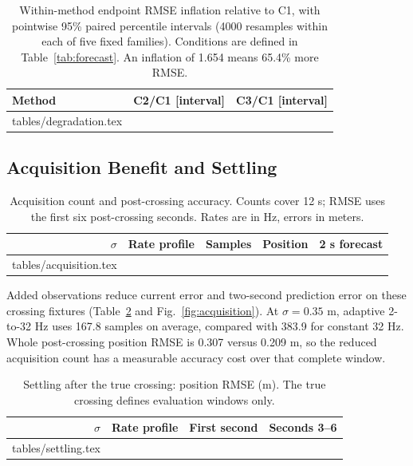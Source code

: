\documentclass[journal]{IEEEtran}
\makeatletter
\newcommand{\inputrows}[1]{\@@input #1 }
\makeatother
\begin{document}
\begin{table}[t]
\centering
\caption{Within-method endpoint RMSE inflation relative to C1, with
pointwise 95\% paired percentile intervals (4000 resamples within each
of five fixed families). Conditions are defined in Table~\ref{tab:forecast}.
An inflation of 1.654 means 65.4\% more RMSE.}
\label{tab:degradation}
\small\setlength{\tabcolsep}{3pt}
\begin{tabular}{lrr}
\toprule Method & C2/C1 [interval] & C3/C1 [interval]\\\midrule
\inputrows{tables/degradation.tex}
\bottomrule
\end{tabular}
\end{table}

\subsection{Acquisition Benefit and Settling}

\begin{table}[t]
\centering
\caption{Acquisition count and post-crossing accuracy.
Counts cover 12 s; RMSE uses the first six post-crossing seconds.
Rates are in Hz, errors in meters.}
\label{tab:acquisition}
\small\setlength{\tabcolsep}{3.5pt}
\begin{tabular}{rlrrr}
\toprule $\sigma$ & Rate profile & Samples & Position & 2 s forecast\\\midrule
\inputrows{tables/acquisition.tex}
\bottomrule
\end{tabular}
\end{table}

Added observations reduce current error and two-second prediction error
on these crossing fixtures (Table~\ref{tab:acquisition} and
Fig.~\ref{fig:acquisition}). At $\sigma=0.35$ m, adaptive 2-to-32 Hz
uses 167.8 samples on average, compared with 383.9 for constant 32 Hz.
Whole post-crossing position RMSE is 0.307 versus 0.209 m, so the
reduced acquisition count has a measurable accuracy cost over that
complete window.

\begin{table}[t]
\centering
\caption{Settling after the true crossing: position RMSE (m).
The true crossing defines evaluation windows only.}
\label{tab:settling}
\small
\begin{tabular}{rlrr}
\toprule $\sigma$ & Rate profile & First second & Seconds 3--6\\\midrule
\inputrows{tables/settling.tex}
\bottomrule
\end{tabular}
\end{table}
\end{document}
